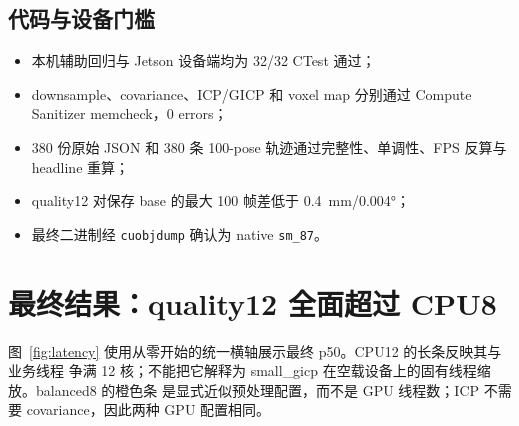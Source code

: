 \documentclass[UTF8,a4paper,11pt,fontset=none]{ctexart}
\begin{document}
\subsection{代码与设备门槛}

\begin{itemize}
  \item 本机辅助回归与 Jetson 设备端均为 32/32 CTest 通过；
  \item downsample、covariance、ICP/GICP 和 voxel map 分别通过 Compute Sanitizer memcheck，0 errors；
  \item 380 份原始 JSON 和 380 条 100-pose 轨迹通过完整性、单调性、FPS 反算与 headline 重算；
  \item quality12 对保存 base 的最大 100 帧差低于 \SI{0.4}{\milli\metre}/\ang{0.004}；
  \item 最终二进制经 \texttt{cuobjdump} 确认为 native \texttt{sm\_87}。
\end{itemize}

\section{最终结果：quality12 全面超过 CPU8}

图~\ref{fig:latency} 使用从零开始的统一横轴展示最终 p50。CPU12 的长条反映其与业务线程
争满 12 核；不能把它解释为 small\_gicp 在空载设备上的固有线程缩放。balanced8 的橙色条
是显式近似预处理配置，而不是 GPU 线程数；ICP 不需要 covariance，因此两种 GPU 配置相同。
\end{document}
